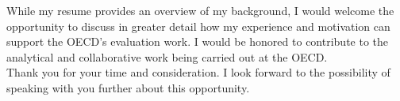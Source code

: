 \documentclass[11pt,a4paper,roman]{moderncv}
\begin{document}
\vspace{1em}
While my resume provides an overview of my background, I would welcome the opportunity to discuss in greater detail how my experience and motivation can support the OECD's evaluation work. I would be honored to contribute to the analytical and collaborative work being carried out at the OECD.\\

\vspace{1em}
Thank you for your time and consideration. I look forward to the possibility of speaking with you further about this opportunity.

\vspace{0.5cm}


\makeletterclosing
\end{document}
